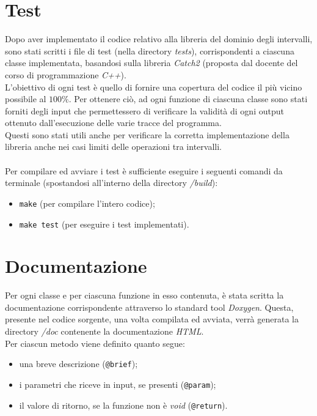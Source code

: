 \documentclass[a4paper, 10pt]{report}
\begin{document}
\section*{Test}
Dopo aver implementato il codice relativo alla libreria del dominio degli intervalli, sono stati scritti i file di test (nella directory \textit{tests}), corrispondenti a ciascuna classe implementata, basandosi sulla libreria \textit{Catch2} (proposta dal docente del corso di programmazione \textit{C++}).\\
L'obiettivo di ogni test è quello di fornire una copertura del codice il più vicino possibile al $100\%$. Per ottenere ciò, ad ogni funzione di ciascuna classe sono stati forniti degli input che permettessero di verificare la validità di ogni output ottenuto dall'esecuzione delle varie tracce del programma.\\
Questi sono stati utili anche per verificare la corretta implementazione della libreria anche nei casi limiti delle operazioni tra intervalli.\\
\\
Per compilare ed avviare i test è sufficiente eseguire i seguenti comandi da terminale (spostandosi all'interno della directory \textit{/build}):
\begin{itemize}
	\item \verb|make| (per compilare l'intero codice);
	\item \verb|make test| (per eseguire i test implementati).
\end{itemize}


\section*{Documentazione}
Per ogni classe e per ciascuna funzione in esso contenuta, è stata scritta la documentazione corrispondente attraverso lo standard tool \textit{Doxygen}. Questa, presente nel codice sorgente, una volta compilata ed avviata, verrà generata la directory \textit{/doc} contenente la documentazione \textit{HTML}.\\
Per ciascun metodo viene definito quanto segue:
\begin{itemize}
	\item una breve descrizione (\verb|@brief|);
	\item i parametri che riceve in input, se presenti (\verb|@param|);
	\item il valore di ritorno, se la funzione non è \textit{void} (\verb|@return|).
\end{itemize}
\end{document}
